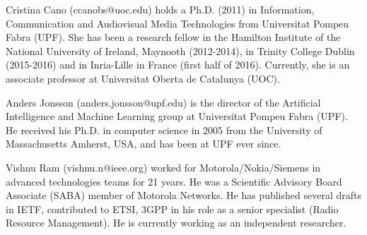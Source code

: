 \documentclass[journal]{IEEEtran}
\begin{document}
\begin{IEEEbiographynophoto}{Cristina Cano}
(ccanobs@uoc.edu) holds a Ph.D. (2011) in Information, Communication and Audiovisual Media Technologies from Universitat Pompeu Fabra (UPF). She has been a research fellow in the Hamilton Institute of the National University of Ireland, Maynooth (2012-2014), in Trinity College Dublin (2015-2016) and in Inria-Lille in France (first half of 2016). Currently, she is an associate professor at Universitat Oberta de Catalunya (UOC). 
\end{IEEEbiographynophoto}

\begin{IEEEbiographynophoto}{Anders Jonsson}
(anders.jonsson@upf.edu) is the director of the Artificial Intelligence and Machine Learning group at Universitat Pompeu Fabra (UPF). He received his Ph.D. in computer science in 2005 from the University of Massachusetts Amherst, USA, and has been at UPF ever since.
\end{IEEEbiographynophoto}

\begin{IEEEbiographynophoto}{Vishnu Ram}
(vishnu.n@ieee.org) worked for Motorola/Nokia/Siemens in advanced technologies teams for 21 years. He was a Scientific Advisory Board Associate (SABA) member of Motorola Networks. He has published several drafts in IETF, contributed to ETSI, 3GPP in his role as a senior specialist (Radio Resource Management). He is currently working as an independent researcher.	
\end{IEEEbiographynophoto}

\vfill




\end{document}
